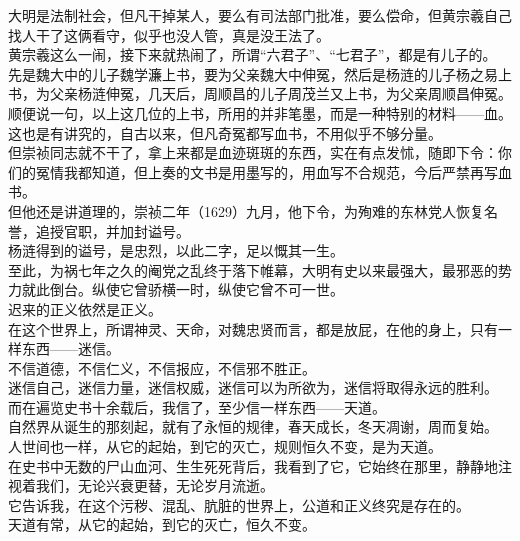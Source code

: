 \begin{multicols}{\theparacolNo}
大明是法制社会，但凡干掉某人，要么有司法部门批准，要么偿命，但黄宗羲自己找人干了这俩看守，似乎也没人管，真是没王法了。\\

黄宗羲这么一闹，接下来就热闹了，所谓“六君子”、“七君子”，都是有儿子的。\\

先是魏大中的儿子魏学濂上书，要为父亲魏大中伸冤，然后是杨涟的儿子杨之易上书，为父亲杨涟伸冤，几天后，周顺昌的儿子周茂兰又上书，为父亲周顺昌伸冤。\\

顺便说一句，以上这几位的上书，所用的并非笔墨，而是一种特别的材料——血。\\

这也是有讲究的，自古以来，但凡奇冤都写血书，不用似乎不够分量。\\

但崇祯同志就不干了，拿上来都是血迹斑斑的东西，实在有点发怵，随即下令：你们的冤情我都知道，但上奏的文书是用墨写的，用血写不合规范，今后严禁再写血书。\\

但他还是讲道理的，崇祯二年（1629）九月，他下令，为殉难的东林党人恢复名誉，追授官职，并加封谥号。\\

杨涟得到的谥号，是忠烈，以此二字，足以慨其一生。\\

至此，为祸七年之久的阉党之乱终于落下帷幕，大明有史以来最强大，最邪恶的势力就此倒台。纵使它曾骄横一时，纵使它曾不可一世。\\

迟来的正义依然是正义。\\

在这个世界上，所谓神灵、天命，对魏忠贤而言，都是放屁，在他的身上，只有一样东西——迷信。\\

不信道德，不信仁义，不信报应，不信邪不胜正。\\

迷信自己，迷信力量，迷信权威，迷信可以为所欲为，迷信将取得永远的胜利。\\

而在遍览史书十余载后，我信了，至少信一样东西——天道。\\

自然界从诞生的那刻起，就有了永恒的规律，春天成长，冬天凋谢，周而复始。\\

人世间也一样，从它的起始，到它的灭亡，规则恒久不变，是为天道。\\

在史书中无数的尸山血河、生生死死背后，我看到了它，它始终在那里，静静地注视着我们，无论兴衰更替，无论岁月流逝。\\

它告诉我，在这个污秽、混乱、肮脏的世界上，公道和正义终究是存在的。\\

天道有常，从它的起始，到它的灭亡，恒久不变。\\
\ifnum{}
	\end{multicols}
\fi
\newpage
